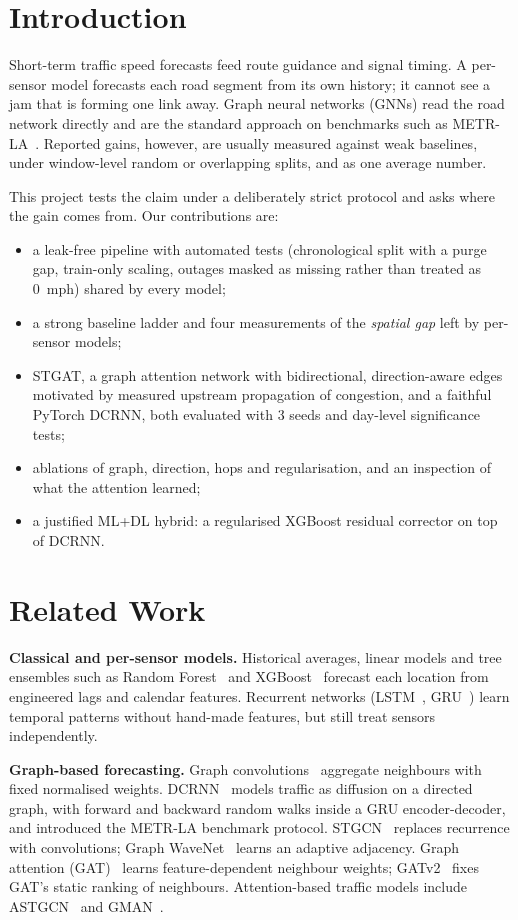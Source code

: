 \documentclass[conference]{IEEEtran}
\begin{document}
\section{Introduction}
Short-term traffic speed forecasts feed route guidance and signal timing. A per-sensor model forecasts each road
segment from its own history; it cannot see a jam that is forming one link away. Graph neural networks (GNNs) read the
road network directly and are the standard approach on benchmarks such as METR-LA~\cite{li2018dcrnn,yu2018stgcn,
wu2019graphwavenet}. Reported gains, however, are usually measured against weak baselines, under window-level random
or overlapping splits, and as one average number.

This project tests the claim under a deliberately strict protocol and asks where the gain comes from. Our
contributions are:
\begin{itemize}
\item a leak-free pipeline with automated tests (chronological split with a purge gap, train-only scaling, outages
masked as missing rather than treated as 0~mph) shared by every model;
\item a strong baseline ladder and four measurements of the \emph{spatial gap} left by per-sensor models;
\item STGAT, a graph attention network with bidirectional, direction-aware edges motivated by measured upstream
propagation of congestion, and a faithful PyTorch DCRNN, both evaluated with 3 seeds and day-level significance tests;
\item ablations of graph, direction, hops and regularisation, and an inspection of what the attention learned;
\item a justified ML+DL hybrid: a regularised XGBoost residual corrector on top of DCRNN.
\end{itemize}

\section{Related Work}
\textbf{Classical and per-sensor models.} Historical averages, linear models and tree ensembles such as Random
Forest~\cite{breiman2001rf} and XGBoost~\cite{chen2016xgboost} forecast each location from engineered lags and calendar
features. Recurrent networks (LSTM~\cite{hochreiter1997lstm}, GRU~\cite{cho2014gru}) learn temporal patterns without
hand-made features, but still treat sensors independently.

\textbf{Graph-based forecasting.} Graph convolutions~\cite{kipf2017gcn} aggregate neighbours with fixed normalised
weights. DCRNN~\cite{li2018dcrnn} models traffic as diffusion on a directed graph, with forward and backward random
walks inside a GRU encoder-decoder, and introduced the METR-LA benchmark protocol. STGCN~\cite{yu2018stgcn} replaces
recurrence with convolutions; Graph WaveNet~\cite{wu2019graphwavenet} learns an adaptive adjacency.
Graph attention (GAT)~\cite{velickovic2018gat} learns feature-dependent neighbour weights; GATv2~\cite{brody2022gatv2}
fixes GAT's static ranking of neighbours. Attention-based traffic models include ASTGCN~\cite{guo2019astgcn} and
GMAN~\cite{zheng2020gman}.
\end{document}
